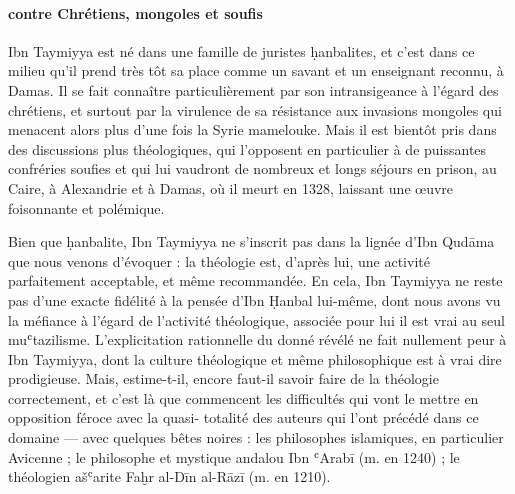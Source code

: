 \paragraph{contre Chrétiens, mongoles et soufis}Ibn Taymiyya est né dans une famille de juristes ḥanbalites, et c'est
dans ce milieu qu'il prend très tôt sa place comme un savant et un
enseignant reconnu, à Damas. Il se fait connaître particulièrement par
son intransigeance à l'égard des chrétiens, et surtout par la virulence
de sa résistance aux invasions mongoles qui menacent alors plus d'une
fois la Syrie mamelouke. Mais il est bientôt pris dans des discussions
plus théologiques, qui l'opposent en particulier à de puissantes
confréries soufies et qui lui vaudront de nombreux et longs séjours en
prison, au Caire, à Alexandrie et à Damas, où il meurt en 1328, laissant
une œuvre foisonnante et polémique.

Bien que ḥanbalite, Ibn Taymiyya ne s'inscrit pas dans la lignée d'Ibn
Qudāma que nous venons d'évoquer : la théologie est, d'après lui, une
activité parfaitement acceptable, et même recommandée. En cela, Ibn
Taymiyya ne reste pas d'une exacte fidélité à la pensée d'Ibn Ḥanbal
lui-même, dont nous avons vu la méfiance à l'égard de l'activité
théologique, associée pour lui il est vrai au seul muʿtazilisme.
L'explicitation rationnelle du donné révélé ne fait nullement peur à Ibn
Taymiyya, dont la culture théologique et même philosophique est à vrai
dire prodigieuse. Mais, estime-t-il, encore faut-il savoir faire de la
théologie correctement, et c'est là que commencent les difficultés qui
vont le mettre en opposition féroce avec la quasi- totalité des auteurs
qui l'ont précédé dans ce domaine --- avec quelques bêtes noires : les
philosophes islamiques, en particulier Avicenne ; le philosophe et
mystique andalou Ibn ʿArabī (m. en 1240) ; le théologien ašʿarite Faḫr
al-Dīn al-Rāzī (m. en 1210).

